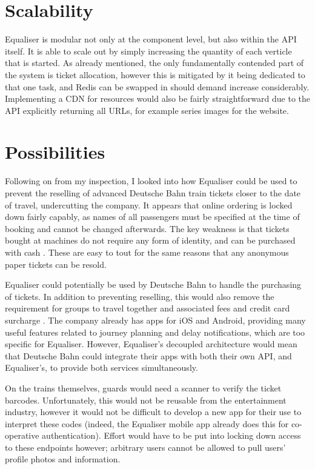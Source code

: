 \documentclass[12pt,a4paper]{bhamdissertation}
\begin{document}
\section{Scalability}

Equaliser is modular not only at the component level, but also within the API itself. It is able to scale out by simply increasing the quantity of each verticle that is started. As already mentioned, the only fundamentally contended part of the system is ticket allocation, however this is mitigated by it being dedicated to that one task, and Redis can be swapped in should demand increase considerably. Implementing a CDN for resources would also be fairly straightforward due to the API explicitly returning all URLs, for example series images for the website.

\section{Possibilities}

Following on from my inspection, I looked into how Equaliser could be used to prevent the reselling of advanced Deutsche Bahn train tickets closer to the date of travel, undercutting the company. It appears that online ordering is locked down fairly capably, as names of all passengers must be specified at the time of booking and cannot be changed afterwards. The key weakness is that tickets bought at machines do not require any form of identity, and can be purchased with cash \cite{D15}. These are easy to tout for the same reasons that any anonymous paper tickets can be resold.

Equaliser could potentially be used by Deutsche Bahn to handle the purchasing of tickets. In addition to preventing reselling, this would also remove the requirement for groups to travel together \cite{D17} and associated fees and credit card surcharge \cite{D171}. The company already has apps for iOS and Android, providing many useful features related to journey planning and delay notifications, which are too specific for Equaliser. However, Equaliser's decoupled architecture would mean that Deutsche Bahn could integrate their apps with both their own API, and Equaliser's, to provide both services simultaneously.

On the trains themselves, guards would need a scanner to verify the ticket barcodes. Unfortunately, this would not be reusable from the entertainment industry, however it would not be difficult to develop a new app for their use to interpret these codes (indeed, the Equaliser mobile app already does this for co-operative authentication). Effort would have to be put into locking down access to these endpoints however; arbitrary users cannot be allowed to pull users' profile photos and information.
\end{document}
